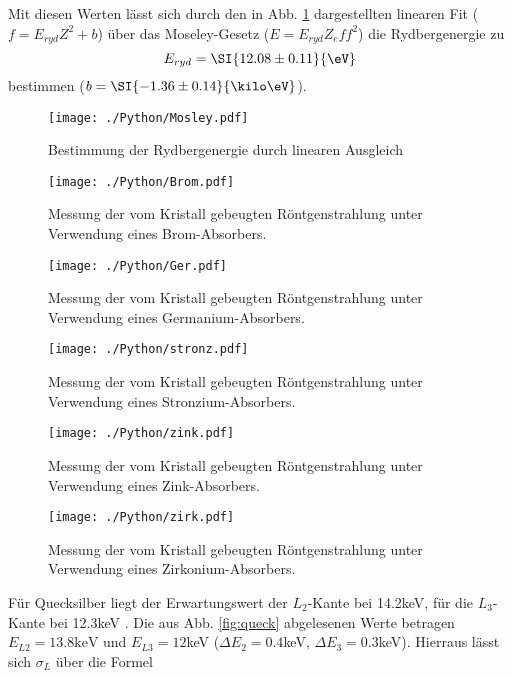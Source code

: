 Mit diesen Werten lässt sich durch den in Abb. \ref{fig:moseley} dargestellten linearen Fit ($f=E_{ryd} Z^2 +b$) über das Moseley-Gesetz ($E = E_{ryd} Z_eff^2$) die Rydbergenergie zu
\begin{equation*}
  E_{ryd} = \SI{12.08 \pm 0.11}{\eV}
\end{equation*}
bestimmen ($b= \SI{-1.36 \pm 0.14}{\kilo \eV}$).

\begin{figure}
  \centering
  \texttt{[image: ./Python/Mosley.pdf]}
  \caption{Bestimmung der Rydbergenergie durch linearen Ausgleich}
  \label{fig:moseley}
\end{figure}

\begin{figure}
  \centering
  \texttt{[image: ./Python/Brom.pdf]}
  \caption{Messung der vom Kristall gebeugten Röntgenstrahlung unter Verwendung eines Brom-Absorbers.}
  \label{fig:brom}
\end{figure}


\begin{figure}
  \centering
  \texttt{[image: ./Python/Ger.pdf]}
  \caption{Messung der vom Kristall gebeugten Röntgenstrahlung unter Verwendung eines Germanium-Absorbers.}
  \label{fig:ger}
\end{figure}


\begin{figure}
  \centering
  \texttt{[image: ./Python/stronz.pdf]}
  \caption{Messung der vom Kristall gebeugten Röntgenstrahlung unter Verwendung eines Stronzium-Absorbers.}
  \label{fig:stronz}
\end{figure}



\begin{figure}
  \centering
  \texttt{[image: ./Python/zink.pdf]}
  \caption{Messung der vom Kristall gebeugten Röntgenstrahlung unter Verwendung eines Zink-Absorbers.}
  \label{fig:zink}
\end{figure}



\begin{figure}
  \centering
  \texttt{[image: ./Python/zirk.pdf]}
  \caption{Messung der vom Kristall gebeugten Röntgenstrahlung unter Verwendung eines Zirkonium-Absorbers.}
  \label{fig:zirk}
\end{figure}

Für Quecksilber liegt der Erwartungswert der $L_2$-Kante bei 14.2keV, für die $L_3$-Kante bei 12.3keV \cite{skuld}. Die aus Abb. \ref{fig:queck} abgelesenen Werte betragen $E_{L2} = 13.8 \si{\kilo \eV}$ und $E_{L3} = 12$keV ($\Delta E_2 = 0.4$keV, $\Delta E_3 = 0.3$keV).
Hierraus lässt sich $\sigma_L$ über die Formel

